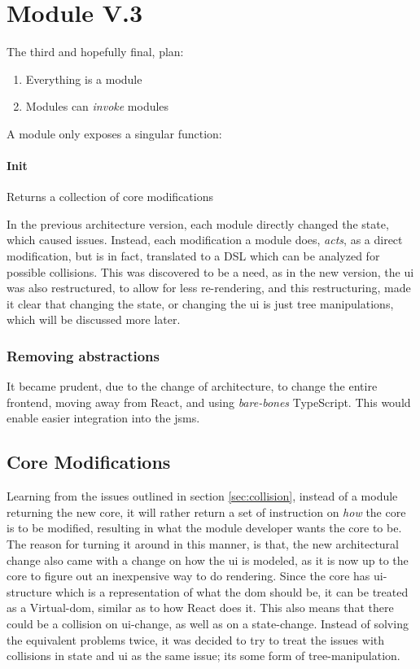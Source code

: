 \section{Module V.3} \label{sec:mod3}

The third and hopefully final, plan:

\begin{enumerate}
  \item Everything is a module
  \item Modules can \textit{invoke} modules
\end{enumerate}

A module only exposes a singular function:

\paragraph{Init} Returns a collection of core modifications

In the previous architecture version, each module directly changed the state,
which caused issues. Instead, each modification a module does, \textit{acts}, as
a direct modification, but is in fact, translated to a DSL which can be analyzed
for possible collisions. This was discovered to be a need, as in the new
version, the \gls{ui} was also restructured, to allow for less re-rendering, and
this restructuring, made it clear that changing the state, or changing the
\gls{ui} is just tree manipulations, which will be discussed more later.

\subsubsection{Removing abstractions}

It became prudent, due to the change of architecture, to change the entire
frontend, moving away from React, and using \textit{bare-bones} TypeScript. This
would enable easier integration into the \gls{jsms}.

\subsection{Core Modifications}

Learning from the issues outlined in section \ref{sec:collision}, instead of a
module returning the new core, it will rather return a set of instruction on
\textit{how} the core is to be modified, resulting in what the module developer
wants the core to be. The reason for turning it around in this manner, is that,
the new architectural change also came with a change on how the \gls{ui} is
modeled, as it is now up to the core to figure out an inexpensive way to do
rendering. Since the core has \gls{ui}-structure which is a representation of
what the \gls{dom} should be, it can be treated as a Virtual-\gls{dom}, similar
as to how React does it. This also means that there could be a collision on
\gls{ui}-change, as well as on a state-change. Instead of solving the equivalent
problems twice, it was decided to try to treat the issues with collisions in
state and \gls{ui} as the same issue; its some form of tree-manipulation.

